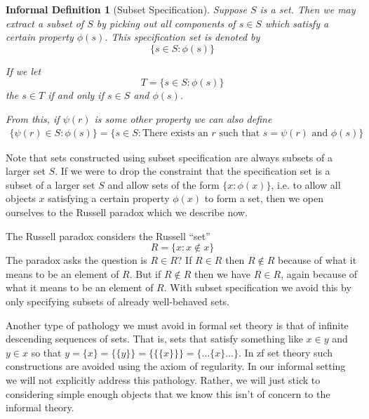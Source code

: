 \documentclass[12pt]{article}
\theoremstyle{break}
\theoremstyle{break}
\theoremstyle{break}
\theoremstyle{break}
\theoremstyle{break}
\newtheorem{informal definition}[definition]{Informal Definition}
\theoremstyle{break}
\newtheorem{informal theorem}[theorem]{Informal Theorem}
\newcommand{\qq}[1]{``#1''}
\begin{document}
	\begin{informal definition}[Subset Specification]
		Suppose $S$ is a set.
		Then we may extract a subset of $S$ by picking out all components of $s\in S$ which satisfy a certain property $\phi(s)$.
		This specification set is denoted by
		\begin{equation*}
			\{s\in S: \phi(s)\}
		\end{equation*}
		
		If we let
		\begin{equation*}
			T = \{s\in S: \phi(s)\}
		\end{equation*}
		the $s\in T$ if and only if $s\in S$ and $\phi(s)$.
		
		From this, if $\psi(r)$ is some other property we can also define
		\begin{align*}
			\{\psi(r) \in S: \phi(s)\} = \{s\in S: \text{There exists an } r \text{ such that } s = \psi(r) \text{ and } \phi(s)\}
		\end{align*}
	\end{informal definition}
	
	Note that sets constructed using subset specification are always subsets of a larger set $S$.
	If we were to drop the constraint that the specification set is a subset of a larger set $S$ and allow sets of the form $\{x: \phi(x)\}$, i.e. to allow all objects $x$ satisfying a certain property $\phi(x)$ to form a set, then we open ourselves to the Russell paradox which we describe now.
	
	The Russell paradox considers the Russell \qq{set}
	\begin{equation*}
		R = \{x: x\not \in x\}
	\end{equation*}
	The paradox asks the question is $R\in R$?
	If $R\in R$ then $R\not \in R$ because of what it means to be an element of $R$.
	But if $R\not \in R$ then we have $R\in R$, again because of what it means to be an element of $R$.
	With subset specification we avoid this by only specifying subsets of already well-behaved sets.
	
	Another type of pathology we must avoid in formal set theory is that of infinite descending sequences of sets.
	That is, sets that satisfy something like $x\in y$ and $y\in x$ so that $y = \{x\} = \{\{y\}\} = \{\{\{x\}\}\} = \{\ldots \{x\} \ldots \}$.
	In \gls{zf} set theory such constructions are avoided using the axiom of regularity.
	In our informal setting we will not explicitly address this pathology.
	Rather, we will just stick to considering simple enough objects that we know this isn't of concern to the informal theory.
	
\end{document}
